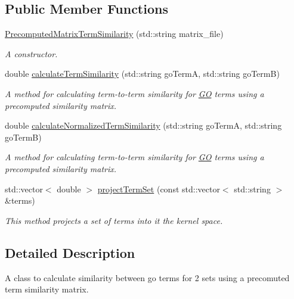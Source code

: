 \subsection*{Public Member Functions}
\begin{DoxyCompactItemize}
\item 
\hyperlink{classPrecomputedMatrixTermSimilarity_a7b41f4870cea2125e2997fb5eea5f6fb}{Precomputed\+Matrix\+Term\+Similarity} (std\+::string matrix\+\_\+file)
\begin{DoxyCompactList}\small\item\em A constructor. \end{DoxyCompactList}\item 
double \hyperlink{classPrecomputedMatrixTermSimilarity_accf2925db5da35cc040f2016813ed631}{calculate\+Term\+Similarity} (std\+::string go\+TermA, std\+::string go\+TermB)
\begin{DoxyCompactList}\small\item\em A method for calculating term-\/to-\/term similarity for \hyperlink{namespaceGO}{GO} terms using a precomputed similarity matrix. \end{DoxyCompactList}\item 
double \hyperlink{classPrecomputedMatrixTermSimilarity_ac2057bd30526a99741c06f8b629b6ae2}{calculate\+Normalized\+Term\+Similarity} (std\+::string go\+TermA, std\+::string go\+TermB)
\begin{DoxyCompactList}\small\item\em A method for calculating term-\/to-\/term similarity for \hyperlink{namespaceGO}{GO} terms using a precomputed similarity matrix. \end{DoxyCompactList}\item 
std\+::vector$<$ double $>$ \hyperlink{classPrecomputedMatrixTermSimilarity_a341a4dba0540acd9087091aa63c51220}{project\+Term\+Set} (const std\+::vector$<$ std\+::string $>$ \&terms)
\begin{DoxyCompactList}\small\item\em This method projects a set of terms into it the kernel space. \end{DoxyCompactList}\end{DoxyCompactItemize}


\subsection{Detailed Description}
A class to calculate similarity between go terms for 2 sets using a precomuted term similarity matrix. 


